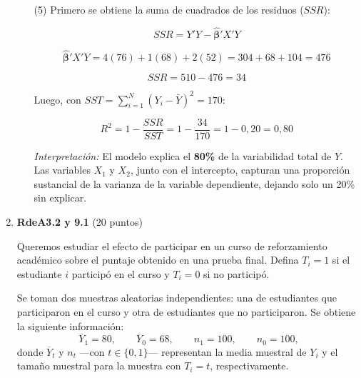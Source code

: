 \documentclass[10pt,a4paper]{article}
\begin{document}
\begin{enumerate}
{\begin{enumerate}
$$\hat{Y}_i = 4 + 1 \cdot X_{1i} + 2 \cdot X_{2i}$$

\textit{Interpretación \textbf{(2 puntos)}:} Controlando por $X_2$, un aumento de una unidad en $X_1$ se asocia a un
incremento de 1 unidad en $\hat{Y}$. Del mismo modo, controlando por $X_1$, un aumento
de una unidad en $X_2$ se asocia a un incremento de 2 unidades en $\hat{Y}$. El intercepto indica que cuando $X_1 = X_2 = 0$, el valor predicho de $Y$ es 4.

\item[(5)] Primero se obtiene la suma de cuadrados de los residuos ($SSR$):

$$SSR = Y'Y - \hat{\bm{\beta}}' X'Y$$

$$\hat{\bm{\beta}}' X'Y = 4(76) + 1(68) + 2(52) = 304 + 68 + 104 = 476$$

$$SSR = 510 - 476 = 34$$

Luego, con $SST = \displaystyle\sum_{i=1}^{N}(Y_i - \bar{Y})^2 = 170$:

$$R^2 = 1 - \frac{SSR}{SST} = 1 - \frac{34}{170} = 1 - 0{,}20 = \boxed{0{,}80}$$

\textit{Interpretación:} El modelo explica el \textbf{80\%} de la variabilidad total de $Y$.
Las variables $X_1$ y $X_2$, junto con el intercepto, capturan una proporción sustancial de la varianza de la variable dependiente, dejando solo un 20\% sin explicar. 

\end{enumerate}
}

            \item \textbf{RdeA3.2 y 9.1}  (20 puntos) 

    Queremos estudiar el efecto de participar en un curso de reforzamiento académico sobre el puntaje obtenido en una prueba final. Defina \(T_i=1\) si el estudiante \(i\) participó en el curso y \(T_i=0\) si no participó.

    Se toman dos muestras aleatorias independientes: una de estudiantes que participaron en el curso y otra de estudiantes que no participaron. Se obtiene la siguiente información:
    $$
        \overline Y_1
        =
        80,
        \qquad
        \overline Y_0
        =
        68,
        \qquad
        n_1=100,
        \qquad
        n_0=100
        \text{,}
    $$
    donde $\overline Y_t$ y $n_t$ ---con $t \in \lbrace 0, 1 \rbrace$--- representan la media muestral de $Y_i$ y el tamaño muestral para la muestra con $T_i = t$, respectivamente.
    

\end{enumerate}
\end{document}
